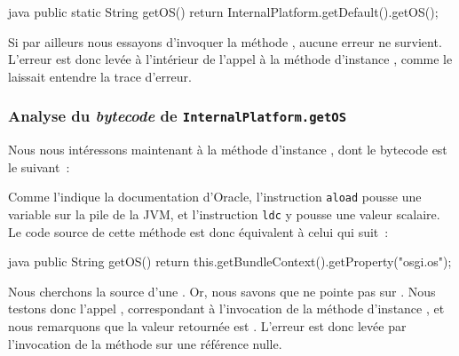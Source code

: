 \begin{imtaCode}{java}
public static String getOS() {
    return InternalPlatform.getDefault().getOS();
}
\end{imtaCode}

Si par ailleurs nous essayons d'invoquer la méthode , aucune erreur ne survient.
L'erreur est donc levée à l'intérieur de l'appel à la méthode d'instance , comme le laissait entendre la trace d'erreur.


\subsubsection{Analyse du \textit{bytecode} de \texttt{InternalPlatform.getOS}}

Nous nous intéressons maintenant à la méthode d'instance , dont le bytecode est le suivant~:


Comme l'indique la documentation d'Oracle, l'instruction \texttt{aload} \cite{javaaload} pousse une variable sur la pile de la JVM, et l'instruction %
\texttt{ldc} \cite{javaldc} y pousse une valeur scalaire.
Le code source de cette méthode est donc équivalent à celui qui suit~:

\begin{imtaCode}{java}
public String getOS() {
    return this.getBundleContext().getProperty("osgi.os");
}
\end{imtaCode}

Nous cherchons la source d'une .
Or, nous savons que  ne pointe pas sur .
Nous testons donc l'appel , correspondant à l'invocation de la méthode d'instance %
, et nous remarquons que la valeur retournée est .
L'erreur  est donc levée par l'invocation de la méthode  sur une référence nulle.

